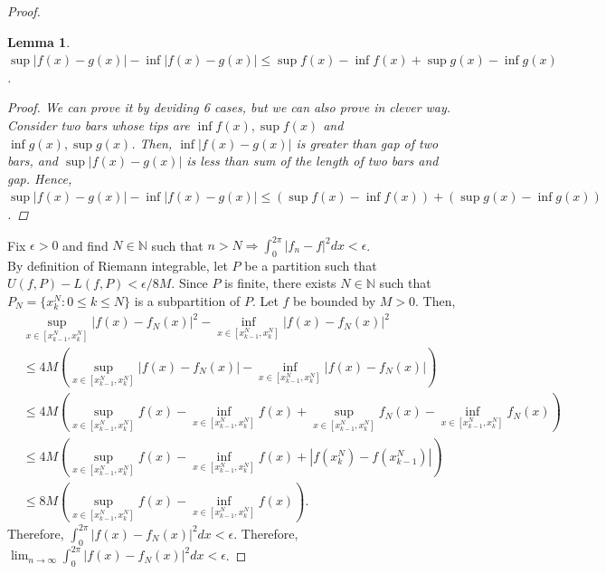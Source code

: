 \documentclass{article}
\newtheorem{lemma}{Lemma}
\begin{document}
\begin{enumerate}[font = \Large\bfseries\itshape\space, leftmargin = 3mm, labelsep = 3mm]
\begin{proof}
\begin{lemma}
$\sup |f(x) - g(x)| - \inf |f(x)-g(x)|
\leq \sup f(x) - \inf f(x) + \sup g(x) - \inf g(x)$.
\begin{proof}
We can prove it by deviding 6 cases, but we can also prove in clever way.
Consider two bars whose tips are $\inf f(x), \sup f(x)$ and $\inf g(x), \sup g(x)$.
Then, $\inf |f(x) - g(x)|$ is greater than gap of two bars, and $\sup | f(x) - g(x)|$ is less than sum of the length of two bars and gap.
Hence, $\sup|f(x)-g(x)| - \inf|f(x)-g(x)| \leq \left(\sup f(x) - \inf f(x)\right) +\left( \sup g(x) - \inf g(x)\right)$.
\end{proof}
\end{lemma}


Fix $\epsilon > 0$ and find $N \in \mathbb{N}$ such that $n > N \Rightarrow \int_0^{2\pi} |f_n - f|^2 dx < \epsilon$.\\
By definition of Riemann integrable, let $P$ be a partition such that $U(f, P) - L(f, P) < \epsilon/8M$.
Since $P$ is finite, there exists $N \in \mathbb{N}$ such that $P_N = \{ x^N_k : 0 \leq k \leq N\}$ is a subpartition of $P$.
Let $f$ be bounded by $M > 0$.
Then,
$$
\begin{aligned}
&\sup_{x \in [x^N_{k-1}, x^N_k]} |f(x) - f_N(x)|^2 - \inf_{x \in [x^N_{k-1}, x^N_k]} |f(x) - f_N(x)|^2\\
&\leq 4M \left(\sup_{x\in [x^N_{k-1}, x^N_k]} |f(x) - f_N(x)| - \inf_{x\in [x^N_{k-1}, x^N_k]} |f(x) - f_N(x)|\right)\\
&\leq 4M \left(\sup_{x\in [x^N_{k-1}, x^N_k]} f(x) - \inf_{x\in [x^N_{k-1}, x^N_k]}f(x) + \sup_{x\in [x^N_{k-1}, x^N_k]} f_N(x) - \inf_{x\in [x^N_{k-1}, x^N_k]}f_N(x)  \right)\\
&\leq 4M \left(\sup_{x\in [x^N_{k-1}, x^N_k]} f(x) - \inf_{x\in [x^N_{k-1}, x^N_k]}f(x) + |f(x^N_k) - f(x^N_{k-1})|\right)\\
&\leq 8M \left(\sup_{x\in [x^N_{k-1}, x^N_k]} f(x) - \inf_{x\in [x^N_{k-1}, x^N_k]}f(x)\right).
\end{aligned}
$$
Therefore, $\int_0^{2\pi} |f(x) - f_N(x)|^2 dx < \epsilon$.
Therefore, $\lim_{n\rightarrow\infty} \int_0^{2\pi} |f(x) - f_N(x)|^2dx < \epsilon$.
\end{proof}

\end{enumerate}
\end{document}
